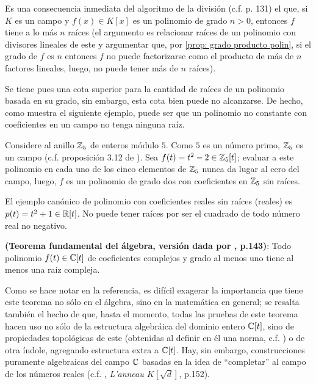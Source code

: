 Es una consecuencia inmediata del algoritmo de la división
(c.f. \cite{rotman} p. 131) el que, si $K$ es un campo
y $f(x) \in K[x]$ es un polinomio de grado $n>0$, 
entonces $f$ tiene a lo más $n$ raíces (el argumento es
relacionar raíces de un polinomio con divisores lineales
de este y argumentar que, por 
\ref{prop: grado producto polin}, 
si el grado de $f$
es $n$ entonces $f$ no puede factorizarse como el producto
de más de $n$ factores lineales, luego, no puede tener más de 
$n$ raíces).

Se tiene pues una cota superior para la cantidad
de raíces de un polinomio basada en 
su grado, sin embargo, esta cota bien puede no
alcanzarse. De hecho, como muestra el siguiente ejemplo,
puede ser que un polinomio no constante con coeficientes en un campo
no tenga ninguna raíz.

\begin{ejemplo}
Considere al anillo $\mathbb{Z}_{5}$ de enteros módulo $5$. Como
$5$ es un número primo, $\mathbb{Z}_{5}$ es un campo (c.f. proposición
3.12 de \cite{rotman}).
Sea $f(t)=t^{2}-2 \in \mathbb{Z}_{5}[t]$; evaluar a este polinomio
en cada uno de los cinco elementos de $\mathbb{Z}_{5}$
nunca da lugar al cero del campo, luego, $f$ es un polinomio
de grado dos con coeficientes en $\mathbb{Z}_{5}$ sin raíces.
\final
\end{ejemplo}

\begin{ejemplo}
El ejemplo canónico de polinomio con coeficientes reales
sin raíces (reales) es $p(t)=t^{2}+1 \in \mathbb{R}[t]$. 
No puede tener raíces por
ser el cuadrado de todo número real no negativo. 
\final 
\end{ejemplo}



\begin{teo}
\label{teo: fundamental del algebra}
\textbf{(Teorema fundamental del álgebra, versión dada por \cite{kurosch}, p.143)}:
Todo polinomio
$f(t) \in \mathbb{C}[t]$ de coeficientes complejos
y grado al menos uno
tiene al menos una raíz compleja.
\end{teo}

Como se hace notar en la referencia, es difícil exagerar
la importancia que tiene este teorema no sólo en el álgebra, 
sino en la matemática en general; se resalta también el hecho
de que, hasta el momento, todas las pruebas de este teorema
hacen uso no sólo de la estructura algebráica del dominio entero
$\mathbb{C}[t]$, sino de propiedades topológicas de este (obtenidas
al definir en él una norma, c.f.
) o de otra índole, 
agregando estructura
extra a $\mathbb{C}[t]$. Hay, sin embargo, construcciones puramente algebraicas
del campo $\mathbb{C}$ basadas en la idea de ``completar'' al campo
de los números reales (c.f. \cite{godement}, 
\textit{L'anneau $K[\sqrt{d}]$}, p.152).


